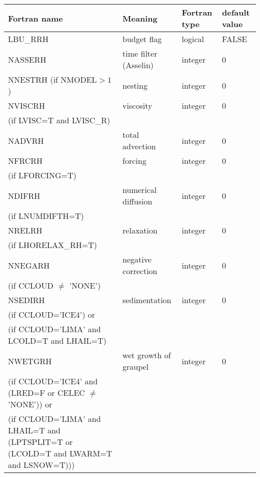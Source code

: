 \begin{longtable} {|p{}|p{}|>{\centering}p{}|p{}<{\centering}|}
\hline
Fortran name & Meaning & Fortran type & default value \\
\hline \hline
\endhead
LBU\_RRH & budget flag & logical & FALSE\index{LBU\_RRH!\innam{NAM\_BU\_RRH}} \\\hline
NASSERH  & time filter (Asselin)   & integer  &  0 \index{NASSERH!\innam{NAM\_BU\_RRH}} \\\hline
NNESTRH (if NMODEL$>1$) & nesting           & integer  &  0 \index{NNESTRH!\innam{NAM\_BU\_RRH}} \\\hline
NVISCRH  & viscosity         & integer  &  0 \index{NVISCRH!\innam{NAM\_BU\_RRH}}\\
(if LVISC=T and LVISC\_R) &  &   &   \\\hline
NADVRH   & total advection   & integer  &  0 \index{NADVRH!\innam{NAM\_BU\_RRH}}\\\hline
NFRCRH   & forcing           & integer  &  0 \index{NFRCRH!\innam{NAM\_BU\_RRH}} \\ \nopagebreak
(if LFORCING=T) &  &   &   \\\hline
NDIFRH   & numerical diffusion & integer  &  0 \index{NDIFRH!\innam{NAM\_BU\_RRH}} \\ \nopagebreak
(if LNUMDIFTH=T) &  &   &   \\\hline
NRELRH   & relaxation        & integer  &  0 \index{NRELRH!\innam{NAM\_BU\_RRH}}\\ \nopagebreak
(if LHORELAX\_RH=T) &  &   &   \\\hline
NNEGARH  & negative correction & integer  &  0 \index{NNEGARH!\innam{NAM\_BU\_RRH}}\\ \nopagebreak
(if CCLOUD $\neq$ 'NONE') & &   &  \\\hline
NSEDIRH  & sedimentation    & integer  &  0 \index{NSEDIRH!\innam{NAM\_BU\_RRH}}\\ \nopagebreak
(if CCLOUD='ICE4') or & &   &  \\ \nopagebreak
(if CCLOUD='LIMA' and LCOLD=T and LHAIL=T) & &   &  \\\hline
NWETGRH  & wet growth of graupel  & integer  &  0 \index{NWETGRH!\innam{NAM\_BU\_RRH}}\\ \nopagebreak
(if CCLOUD='ICE4' and (LRED=F or CELEC $\neq$ 'NONE')) or & &   &  \\
(if CCLOUD='LIMA' and LHAIL=T and (LPTSPLIT=T or (LCOLD=T and LWARM=T and LSNOW=T))) & &   &  \\\hline

\end{longtable}
